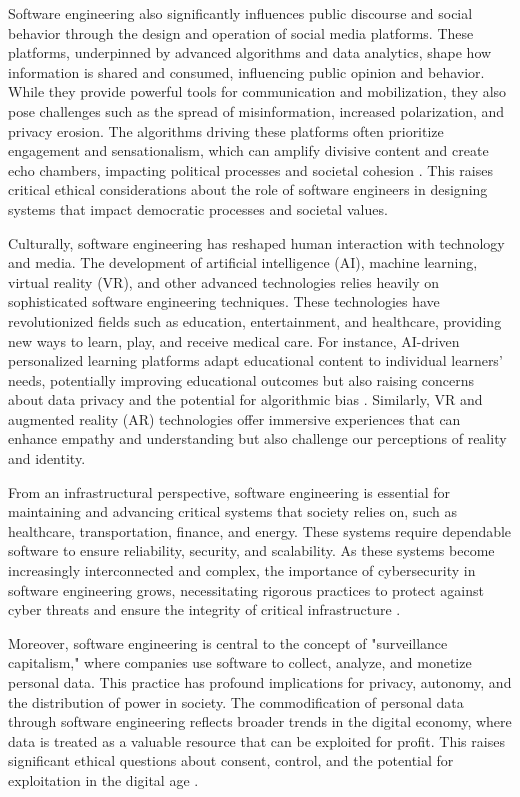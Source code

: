 \begin{refsection}
Software engineering also significantly influences public discourse and social behavior through the design and operation of social media platforms. These platforms, underpinned by advanced algorithms and data analytics, shape how information is shared and consumed, influencing public opinion and behavior. While they provide powerful tools for communication and mobilization, they also pose challenges such as the spread of misinformation, increased polarization, and privacy erosion. The algorithms driving these platforms often prioritize engagement and sensationalism, which can amplify divisive content and create echo chambers, impacting political processes and societal cohesion \cite[pp.~56-60]{tufekci2021twitter}. This raises critical ethical considerations about the role of software engineers in designing systems that impact democratic processes and societal values.

Culturally, software engineering has reshaped human interaction with technology and media. The development of artificial intelligence (AI), machine learning, virtual reality (VR), and other advanced technologies relies heavily on sophisticated software engineering techniques. These technologies have revolutionized fields such as education, entertainment, and healthcare, providing new ways to learn, play, and receive medical care. For instance, AI-driven personalized learning platforms adapt educational content to individual learners' needs, potentially improving educational outcomes but also raising concerns about data privacy and the potential for algorithmic bias \cite[pp.~101-104]{oneil2020weapons}. Similarly, VR and augmented reality (AR) technologies offer immersive experiences that can enhance empathy and understanding but also challenge our perceptions of reality and identity.

From an infrastructural perspective, software engineering is essential for maintaining and advancing critical systems that society relies on, such as healthcare, transportation, finance, and energy. These systems require dependable software to ensure reliability, security, and scalability. As these systems become increasingly interconnected and complex, the importance of cybersecurity in software engineering grows, necessitating rigorous practices to protect against cyber threats and ensure the integrity of critical infrastructure \cite[pp.~220-223]{anderson2021security}.

Moreover, software engineering is central to the concept of "surveillance capitalism," where companies use software to collect, analyze, and monetize personal data. This practice has profound implications for privacy, autonomy, and the distribution of power in society. The commodification of personal data through software engineering reflects broader trends in the digital economy, where data is treated as a valuable resource that can be exploited for profit. This raises significant ethical questions about consent, control, and the potential for exploitation in the digital age \cite[pp.~87-90]{zuboff2020surveillance}.


\end{refsection}
